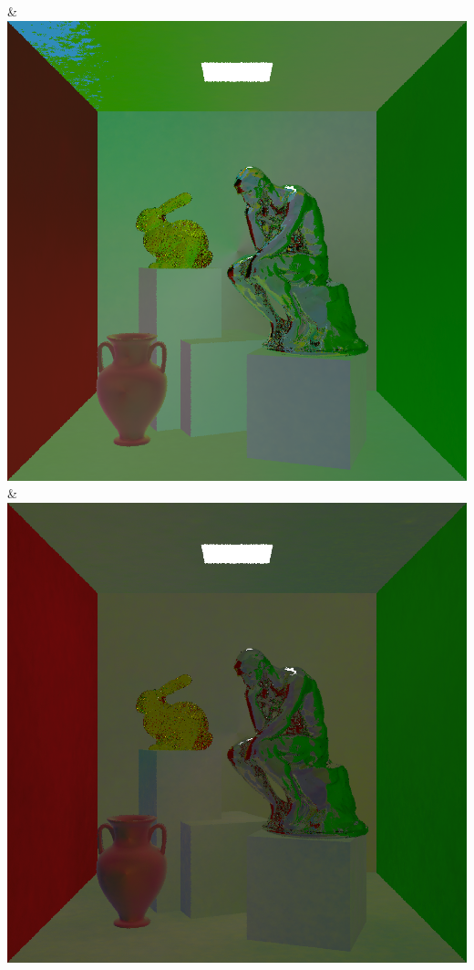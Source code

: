 & \includegraphics[width=\linewidth]{figures/py/tests/batch_size/5+nrc+pt+14_1spp.png}
& \includegraphics[width=\linewidth]{figures/py/tests/batch_size/25+nrc+pt+14_1spp.png}
